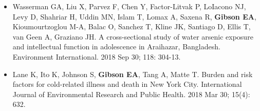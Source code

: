 \documentclass[a4paper,10pt]{article}
\begin{document}
{\begin{itemize}[leftmargin=*]
	\item Wasserman GA, Liu X, Parvez F, Chen Y, Factor-Litvak P, LoIacono NJ, Levy D, Shahriar H, Uddin MN, Islam T, Lomax A, Saxena R, \textbf{Gibson EA}, Kioumourtzoglou M-A, Balac O, Sanchez T, Kline JK, Santiago D, Ellis T, van Geen A, Graziano JH. A cross-sectional study of water arsenic exposure and intellectual function in adolescence in Araihazar, Bangladesh. Environment International. 2018 Sep 30; 118: 304-13. \\
\vspace{.5mm}
	\item Lane K, Ito K, Johnson S, \textbf{Gibson EA}, Tang A, Matte T. Burden and risk factors for cold-related illness and death in New York City. International Journal of Environmental Research and Public Health. 2018 Mar 30; 15(4): 632. 
    \end{itemize}
}
\end{document}
